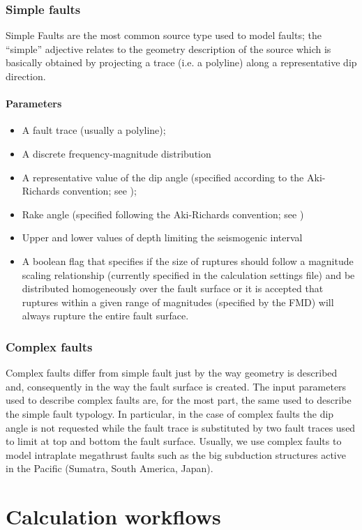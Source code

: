 \subsubsection{Simple faults}
%
Simple Faults are the most common source type used to model faults; the 
``simple'' adjective relates to the geometry description of the source 
which is basically obtained by projecting a trace (i.e. a polyline) along 
a representative dip direction. 
%
\paragraph{Parameters}
%
\begin{itemize}
\item A fault trace (usually a polyline); 
\item A discrete frequency-magnitude distribution
\item A representative value of the dip angle (specified according to 
the Aki-Richards convention; see \citet{aki2002});
\item Rake angle (specified following the Aki-Richards convention; 
see \citet{aki2002}) 
\item Upper and lower values of depth limiting the seismogenic interval 
\item A boolean flag that specifies if the size of ruptures should 
follow a magnitude scaling relationship (currently specified in the 
calculation settings file) and be distributed homogeneously over the 
fault surface or it is accepted that ruptures within a given range of 
magnitudes (specified by the FMD) will always rupture the entire fault 
surface.
\end{itemize}
%
\subsubsection{Complex faults}
%
Complex faults  differ from simple fault just by the way geometry is 
described and, consequently in the way the fault surface is created. The 
input parameters used to describe complex faults are, for the most part, 
the same used to describe the simple fault typology. In particular, in 
the case of complex faults the dip angle is not requested while the fault
trace is substituted by two fault traces used to limit at top and bottom 
the fault surface. 
%
Usually, we use complex faults to model intraplate megathrust faults such 
as the big subduction structures active in the Pacific (Sumatra, South 
America, Japan).

\section{Calculation workflows}
\cleardoublepage

